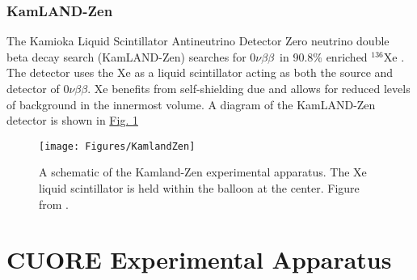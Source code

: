 \documentclass[12pt,a4paper]{article}
\newcommand{\zeronubb}{$0\nu \beta \beta$}
\begin{document}
\subsubsection*{KamLAND-Zen}
The Kamioka Liquid Scintillator Antineutrino Detector Zero neutrino double beta decay search (KamLAND-Zen) searches for \zeronubb~in 90.8\% enriched $^{136}$Xe \cite{KamLAND-Zen:2016pfg}. The detector uses the Xe as a liquid scintillator acting as both the source and detector of \zeronubb. Xe benefits from self-shielding due and allows for reduced levels of background in the innermost volume. A diagram of the KamLAND-Zen detector is shown in \hyperref[fig:kamlandzen]{Fig. \ref*{fig:kamlandzen}}

\begin{figure}[tbph]
\centering
\texttt{[image: Figures/KamlandZen]}
\caption{A schematic of the Kamland-Zen experimental apparatus. The Xe liquid scintillator is held within the balloon at the center. Figure from \cite{::2015uaa}.}
\label{fig:kamlandzen}
\end{figure}

\begin{comment}
\begin{table}[htbp]
\centering
\begin{tabular}{|c|c|c|c|}
\hline 
Experiment & Isotope & \zeronubb~Half-Life (yr) & Q-Value (keV) \\ 
\hline 
Gerda & $^{76}$Ge & $>5.2 \times 10^{25}$ & 2039 \\ 
\hline 
EXO-200 & $^{136}$Xe & $>1.1 \times 10^{25}$ & 2458 \\ 
\hline 
NEMO &  &  \\ 
\hline 
Majorana &  &  \\ 
\hline 
Heidelburg-Moscow &  &  \\ 
\hline 
Kamland-Zen &  &  \\ 
\hline 
CUORE &  & 2528 \\ 
\hline 
\end{tabular} 
\end{table}
\end{comment}

\section{CUORE Experimental Apparatus}
\end{document}
